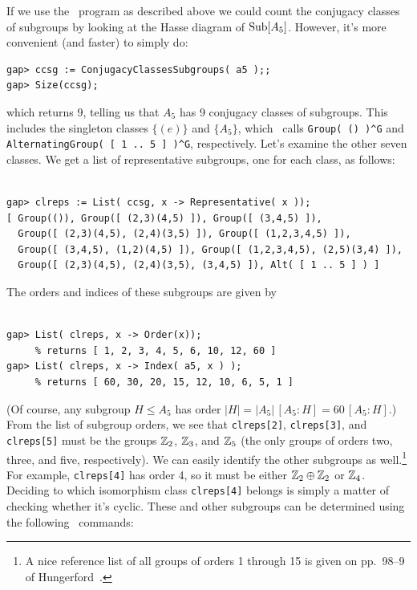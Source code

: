 If we use the \xgap\ program as described above we could count the conjugacy classes of subgroups by
looking at the Hasse diagram of $\operatorname{Sub}[A_5]$.  However, it's more convenient (and
faster) to simply do: 
{\codesize 
\begin{verbatim}
gap> ccsg := ConjugacyClassesSubgroups( a5 );;
gap> Size(ccsg);
\end{verbatim}}
\noindent which returns 9, telling us that $A_5$ has 9 conjugacy classes of subgroups.  
This includes the singleton classes $\{(e)\}$ and $\{A_5\}$,
which \gap\ calls \verb!Group( () )^G! and \verb!AlternatingGroup( [ 1 .. 5 ] )^G!,
respectively. 
Let's examine the other seven classes.  We get a list of representative subgroups, one for
each class, as follows:
{\codesize 
\begin{verbatim}

gap> clreps := List( ccsg, x -> Representative( x ));
[ Group(()), Group([ (2,3)(4,5) ]), Group([ (3,4,5) ]), 
  Group([ (2,3)(4,5), (2,4)(3,5) ]), Group([ (1,2,3,4,5) ]), 
  Group([ (3,4,5), (1,2)(4,5) ]), Group([ (1,2,3,4,5), (2,5)(3,4) ]), 
  Group([ (2,3)(4,5), (2,4)(3,5), (3,4,5) ]), Alt( [ 1 .. 5 ] ) ]

\end{verbatim}}
\noindent The orders and indices of these subgroups are given by
{\codesize 
\begin{verbatim}

gap> List( clreps, x -> Order(x));         
     % returns [ 1, 2, 3, 4, 5, 6, 10, 12, 60 ]
gap> List( clreps, x -> Index( a5, x ) );  
     % returns [ 60, 30, 20, 15, 12, 10, 6, 5, 1 ]

\end{verbatim}}
\noindent (Of course, any subgroup $H\leq A_5$ has order $|H| = |A_5|\,[A_5:H] = 60 \,[A_5:H]$.)  
From the list of subgroup orders, we see that {\tt clreps[2]}, {\tt clreps[3]},
and {\tt clreps[5]} must be the groups $\mathbb{Z}_2$, $\mathbb{Z}_3$, and $\mathbb{Z}_5$ (the only groups of 
orders two, three, and five, respectively).  
We can easily identify the other subgroups as well.\footnote{A
  nice reference list of all groups of orders 1 through 15 is given on pp.~98--9 of
  Hungerford~\cite{Hungerford:1974}.} 
For example, {\tt clreps[4]} has order 4, so it must be either 
$\mathbb{Z}_2 \oplus \mathbb{Z}_2$ or $\mathbb{Z}_4$.  Deciding to which isomorphism class {\tt clreps[4]}
belongs is simply a matter of checking whether it's cyclic.  These and other
subgroups can be determined using the following \gap\ commands:
